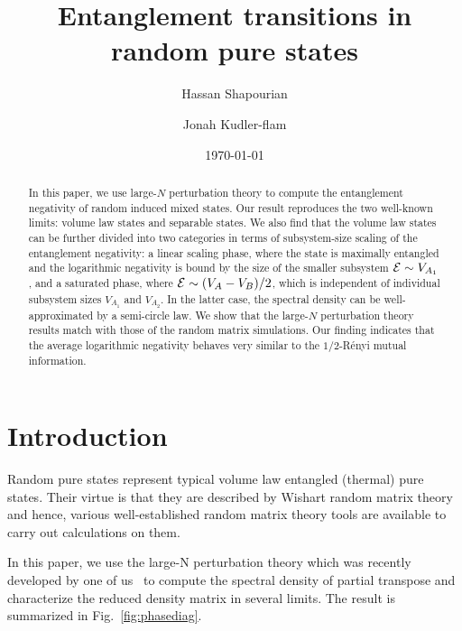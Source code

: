 \documentclass[aps,pra,groupedaddress,twocolumn,notitlepage,superscriptaddress,10pt]{revtex4-1}
\begin{document}
\title{Entanglement transitions in random pure states}
\author{Hassan Shapourian%
  }
\author{Jonah Kudler-flam%
}


\date{\today}

\begin{abstract}
In this paper, we use large-$N$ perturbation theory to compute the entanglement negativity of random induced mixed states. Our result reproduces the two well-known limits: volume law states and separable states. We also find that the volume law states can be further divided into two categories in terms of subsystem-size scaling  of the entanglement  negativity: a linear scaling phase, where the state is maximally entangled and the logarithmic negativity is bound by the size of the smaller subsystem ${\cal E}\sim V_{A_1}$, and a saturated phase, where ${\cal E}\sim (V_{A}-V_B)/2$, which  is independent of individual subsystem sizes $V_{A_1}$ and $V_{A_2}$. In the latter case, the spectral density can be well-approximated by a semi-circle law. We show that the large-$N$ perturbation theory results match with those of the random matrix simulations.
Our finding indicates that the average logarithmic negativity behaves very similar to the $1/2$-R\'enyi mutual information.
\end{abstract}

\maketitle

\section{Introduction}

Random pure states represent typical volume law entangled  (thermal) pure states. Their virtue is that they are described by Wishart random matrix theory and hence, various well-established random matrix theory tools are available to carry out calculations on them.

In this paper, we use the large-N perturbation theory which was recently developed by one of us~\cite{SLA20} to compute the spectral density of partial transpose and characterize the reduced density matrix in several limits. The result is summarized in Fig.~\ref{fig:phasediag}.
\end{document}

